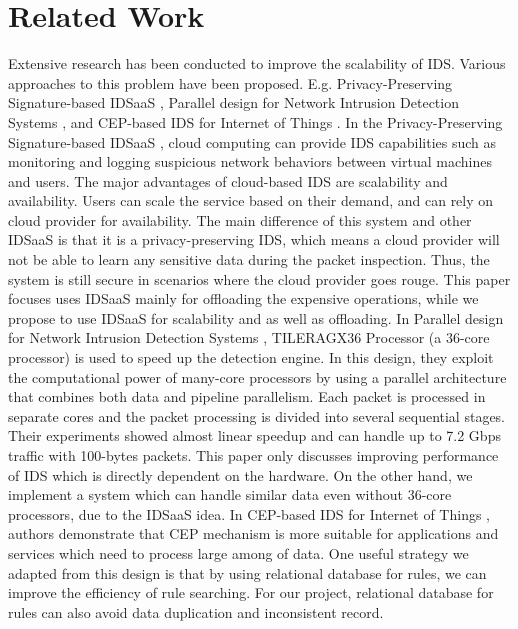\documentclass[conference]{sig-alternate-05-2015}
\begin{document}
\section{Related Work}\label{subsec:relatedwork}
Extensive research has been conducted to improve the scalability of IDS. Various approaches to this problem have been proposed. E.g. Privacy-Preserving Signature-based IDSaaS \cite{IDSaaS}, Parallel design for Network Intrusion Detection Systems \cite{multicore}, and CEP-based IDS for Internet of Things \cite{CEP2}.
In the Privacy-Preserving Signature-based IDSaaS \cite{IDSaaS}, cloud computing can provide IDS capabilities such as monitoring and logging suspicious network behaviors between virtual machines and users. The major advantages of cloud-based IDS are scalability and availability. Users can scale the service based on their demand, and can rely on cloud provider for availability. The main difference of this system and other IDSaaS is that it is a privacy-preserving IDS, which means a cloud provider will not be able to learn any sensitive data during the packet inspection. Thus, the system is still secure in scenarios where the cloud provider goes rouge. This paper focuses uses IDSaaS mainly for offloading the expensive operations, while we propose to use IDSaaS for scalability and as well as offloading.
In Parallel design for Network Intrusion Detection Systems \cite{multicore}, TILERAGX36 Processor (a 36-core processor) is used to speed up the detection engine. In this design, they exploit the computational power of many-core processors by using a parallel architecture that combines both data and pipeline parallelism. Each packet is processed in separate cores and the packet processing is divided into several sequential stages. Their experiments showed almost linear speedup and can handle up to 7.2 Gbps traffic with 100-bytes packets. This paper only discusses improving performance of IDS which is directly dependent on the hardware. On the other hand, we implement a system which can handle similar data even without 36-core processors, due to the IDSaaS idea.  
In CEP-based IDS for Internet of Things \cite{CEP2}, authors demonstrate that CEP mechanism is more suitable for applications and services which need to process large among of data. One useful strategy we adapted from this design is that by using relational database for rules, we can improve the efficiency of rule searching. For our project, relational database for rules can also avoid data duplication and inconsistent record.
\end{document}
